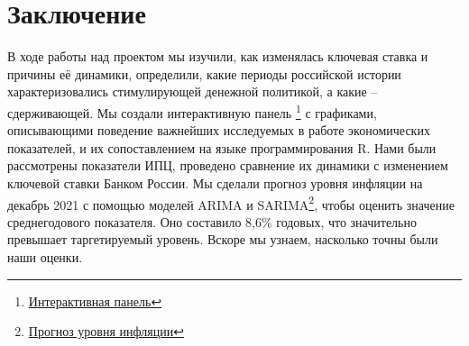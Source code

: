 






\newpage

\section{Заключение}
\noindent
В ходе работы над проектом мы изучили, как изменялась ключевая ставка и причины её динамики, определили, какие периоды российской истории характеризовались стимулирующей денежной политикой, а какие – сдерживающей. Мы создали интерактивную панель \footnote{\href{https://cloud.mail.ru/public/Ghzc/5BbkoCXiv/}{Интерактивная панель}}  с графиками, описывающими поведение важнейших исследуемых в работе экономических показателей, и их сопоставлением на языке программирования R. Нами были рассмотрены показатели ИПЦ, проведено сравнение их динамики с изменением ключевой ставки Банком России. Мы сделали прогноз уровня инфляции на декабрь 2021 с помощью моделей ARIMA и SARIMA\footnote{\href{https://colab.research.google.com/drive/1Ushl61tjySwsZcWbtuyYa8YFMHhyUuRv?usp=sharing}{Прогноз уровня инфляции}},  чтобы оценить значение среднегодового показателя. Оно составило 8,6\% годовых, что значительно превышает таргетируемый уровень. Вскоре мы узнаем, насколько точны были наши оценки.
